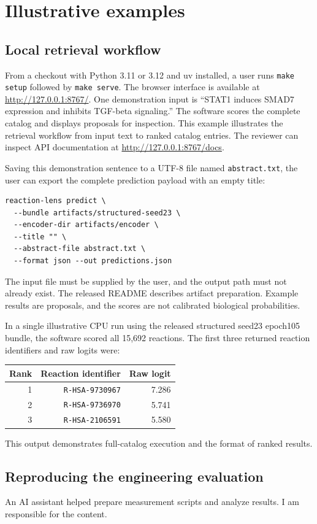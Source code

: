 \documentclass[preprint,12pt,a4paper]{elsarticle}
\begin{document}
\section{Illustrative examples}
\subsection{Local retrieval workflow}
From a checkout with Python 3.11 or 3.12 and uv installed, a user runs
\texttt{make setup} followed by \texttt{make serve}. The browser interface is
available at \url{http://127.0.0.1:8767/}. One demonstration input is
``STAT1 induces SMAD7 expression and inhibits TGF-beta signaling.'' The software
scores the complete catalog and displays proposals for inspection. This example
illustrates the retrieval workflow from input text to ranked catalog entries.
The reviewer can inspect API documentation at \url{http://127.0.0.1:8767/docs}.

Saving this demonstration sentence to a UTF-8 file named \texttt{abstract.txt},
the user can export the complete prediction payload with an empty title:
\begin{verbatim}
reaction-lens predict \
  --bundle artifacts/structured-seed23 \
  --encoder-dir artifacts/encoder \
  --title "" \
  --abstract-file abstract.txt \
  --format json --out predictions.json
\end{verbatim}
The input file must be supplied by the user, and the output path must not already
exist. The released README describes artifact preparation. Example results
are proposals, and the scores are not calibrated biological probabilities.

In a single illustrative CPU run using the released structured seed23 epoch105
bundle, the software scored all 15,692 reactions. The first three returned
reaction identifiers and raw logits were:
\begin{center}
\begin{tabular}{rrr}
\toprule
Rank & Reaction identifier & Raw logit \\
\midrule
1 & \texttt{R-HSA-9730967} & 7.286 \\
2 & \texttt{R-HSA-9736970} & 5.741 \\
3 & \texttt{R-HSA-2106591} & 5.580 \\
\bottomrule
\end{tabular}
\end{center}
This output demonstrates full-catalog execution and the format of ranked results.

\subsection{Reproducing the engineering evaluation}
\label{sec:protocol}
An AI assistant helped prepare measurement scripts and analyze results.
I am responsible for the content.
\end{document}
